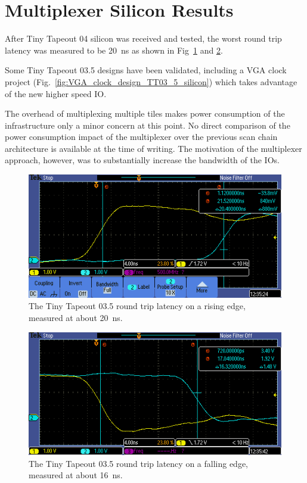 \section{Multiplexer Silicon Results}
\label{sec:multiplexer_silicon_res}
After Tiny Tapeout 04 silicon was received and tested, the worst round trip latency was measured to be \qty{20}{\ns} as shown in Fig~\ref{fig:round_trip_latency_rising_edge} and \ref{fig:round_trip_latency_falling_edge}.

Some Tiny Tapeout 03.5 designs have been validated, including a VGA clock project (Fig.~\ref{fig:VGA_clock_design_TT03_5_silicon}) which takes advantage of the new higher speed IO.

The overhead of multiplexing multiple tiles makes power consumption of the infrastructure only a minor concern at this point. No direct comparison of the power consumption impact of the multiplexer over the previous scan chain architecture is available at the time of writing. The motivation of the multiplexer approach, however, was to substantially increase the bandwidth of the IOs.

\begin{figure}[!t]
\centering
\includegraphics[width=\columnwidth]{./Figs/tt3p5 rising latency.PNG}
\caption{The Tiny Tapeout 03.5 round trip latency on a rising edge, measured at about \qty{20}{\ns}.}
\label{fig:round_trip_latency_rising_edge}
\end{figure}

\begin{figure}[!t]
\centering
\includegraphics[width=\columnwidth]{./Figs/tt3p5 falling latency.PNG}
\caption{The Tiny Tapeout 03.5 round trip latency on a falling edge, measured at about \qty{16}{\ns}.}
\label{fig:round_trip_latency_falling_edge}
\end{figure}

